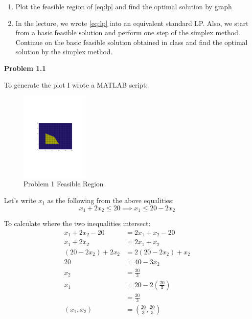 \documentclass[12pt]{article}
\begin{document}
\begin{enumerate}
\item Plot the feasible region of \eqref{eq:lp} and find the optimal solution by graph

\item In the lecture, we wrote \eqref{eq:lp} into an equivalent standard LP. Also, we start from a basic feasible solution and perform one step of the simplex method. Continue on the basic feasible solution obtained in class and find the optimal solution by the simplex method.

\end{enumerate}

\noindent\textbf{Problem 1.1}

To generate the plot I wrote a MATLAB script:


\begin{figure}[H]\caption{Problem 1 Feasible Region}
\begin{center}
\includegraphics[width=0.3\textwidth]{SimplexFeasibleRegion.pdf} 
\end{center}
\end{figure}

Let's write $x_1$ as the following from the above equalities:
$$
x_1 + 2x_2 \le 20 \implies x_1 \le 20- 2x_2
$$

To calculate where the two inequalities intersect:
\begin{align*}
x_1 + 2x_2 -20 &= 2x_1 + x_2 -20 \\
x_1 + 2x_2 &= 2x_1+x_2 \\
(20-2x_2) + 2x_2 &= 2(20-2x_2) + x_2\\
20 &= 40 - 3x_2 \\
x_2 &= \frac{20}{3} \\
x_1 &= 20 - 2\left(\frac{20}{3}\right) \\
&= \frac{20}{3} \\
(x_1, x_2) &= \left(\frac{20}{3}, \frac{20}{3} \right)
\end{align*}
\end{document}

